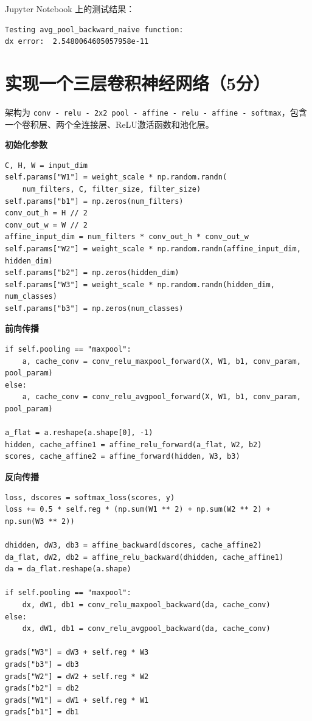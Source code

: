 Jupyter Notebook 上的测试结果：

\begin{lstlisting}[style=cleanpython]
Testing avg_pool_backward_naive function:
dx error:  2.5480064605057958e-11
\end{lstlisting}

\section{实现一个三层卷积神经网络（5分）}

架构为 \texttt{conv - relu - 2x2 pool - affine - relu - affine - softmax}，包含一个卷积层、两个全连接层、ReLU激活函数和池化层。

\textbf{初始化参数}

\begin{lstlisting}[style=cleanpython]
C, H, W = input_dim
self.params["W1"] = weight_scale * np.random.randn(
    num_filters, C, filter_size, filter_size)
self.params["b1"] = np.zeros(num_filters)
conv_out_h = H // 2
conv_out_w = W // 2
affine_input_dim = num_filters * conv_out_h * conv_out_w
self.params["W2"] = weight_scale * np.random.randn(affine_input_dim, hidden_dim)
self.params["b2"] = np.zeros(hidden_dim)
self.params["W3"] = weight_scale * np.random.randn(hidden_dim, num_classes)
self.params["b3"] = np.zeros(num_classes)
\end{lstlisting}

\textbf{前向传播}

\begin{lstlisting}[style=cleanpython]
if self.pooling == "maxpool":
    a, cache_conv = conv_relu_maxpool_forward(X, W1, b1, conv_param, pool_param)
else:
    a, cache_conv = conv_relu_avgpool_forward(X, W1, b1, conv_param, pool_param)

a_flat = a.reshape(a.shape[0], -1)
hidden, cache_affine1 = affine_relu_forward(a_flat, W2, b2)
scores, cache_affine2 = affine_forward(hidden, W3, b3)
\end{lstlisting}

\textbf{反向传播}

\begin{lstlisting}[style=cleanpython]
loss, dscores = softmax_loss(scores, y)
loss += 0.5 * self.reg * (np.sum(W1 ** 2) + np.sum(W2 ** 2) + np.sum(W3 ** 2))

dhidden, dW3, db3 = affine_backward(dscores, cache_affine2)
da_flat, dW2, db2 = affine_relu_backward(dhidden, cache_affine1)
da = da_flat.reshape(a.shape)

if self.pooling == "maxpool":
    dx, dW1, db1 = conv_relu_maxpool_backward(da, cache_conv)
else:
    dx, dW1, db1 = conv_relu_avgpool_backward(da, cache_conv)

grads["W3"] = dW3 + self.reg * W3
grads["b3"] = db3
grads["W2"] = dW2 + self.reg * W2
grads["b2"] = db2
grads["W1"] = dW1 + self.reg * W1
grads["b1"] = db1
\end{lstlisting}

